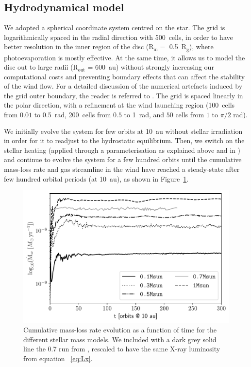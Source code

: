 \documentclass[usenatbib,useAMS,usedcolumn]{mnras}
\begin{document}
\subsection{Hydrodynamical model}\label{sec:hydro-model}

We adopted a spherical coordinate system centred on the star.
The grid is logarithmically spaced in the radial direction with \SI{500}{cells}, in order to have better resolution in the inner region of the disc (R$_\mathrm{in}=$ \SI{0.5}{R_g}), where photoevaporation is mostly effective.
At the same time, it allows us to model the disc out to large radii (R$_\mathrm{out}$ = \SI{600}{\astronomicalunit}) without strongly increasing our computational costs and preventing boundary effects that can affect the stability of the wind flow.
For a detailed discussion of the numerical artefacts induced by the grid outer boundary, the reader is referred to .
The grid is spaced linearly in the polar direction, with a refinement at the wind launching region (\SI{100}{cells} from $0.01$ to \SI{0.5}{rad}, \SI{200}{cells} from $0.5$ to \SI{1}{rad}, and $50$ cells from $1$ to $\pi / 2$ rad).

We initially evolve the system for few orbits at \SI{10}{au} without stellar irradiation in order for it to readjust to the hydrostatic equilibrium. Then, we switch on the stellar heating (applied through a parameterisation as explained above and in ) and continue to evolve the system for a few hundred orbits until the cumulative mass-loss rate and gas streamline in the wind have reached a steady-state after few hundred orbital periods (at \SI{10}{au}), as shown in Figure~\ref{fig:mdotevol}.
\begin{figure}
    \centering
    \includegraphics[width=\columnwidth]{Figure3}
    \caption{Cumulative mass-loss rate evolution as a function of time for the different stellar mass models. We included with a dark grey solid line the \SI{0.7}{\solarmass} run from , rescaled to have the same X-ray luminosity from equation~
    \ref{eq:Lx}. \label{fig:mdotevol}}
\end{figure}
\end{document}
